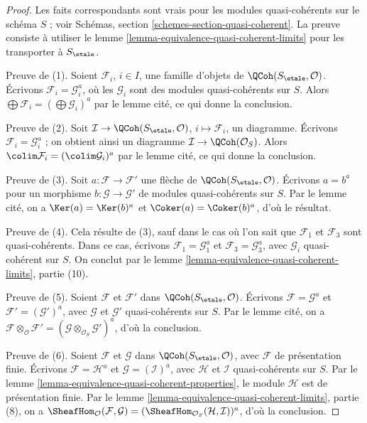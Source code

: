 \begin{proof}
Les faits correspondants sont vrais pour les modules quasi-cohérents sur le
schéma $S$ ; voir Schémas, section
\ref{schemes-section-quasi-coherent}. La preuve consiste à utiliser le
lemme \ref{lemma-equivalence-quasi-coherent-limits} pour les transporter à
$S_\etale$.

\medskip\noindent
Preuve de (1). Soient $\mathcal{F}_i$, $i \in I$, une famille d'objets de
$\QCoh(S_\etale, \mathcal{O})$. Écrivons
$\mathcal{F}_i = \mathcal{G}_i^a$, où les $\mathcal{G}_i$ sont des modules
quasi-cohérents sur $S$. Alors
$\bigoplus \mathcal{F}_i = (\bigoplus \mathcal{G}_i)^a$ par le lemme cité,
ce qui donne la conclusion.

\medskip\noindent
Preuve de (2). Soit
$\mathcal{I} \to \QCoh(S_\etale, \mathcal{O})$,
$i \mapsto \mathcal{F}_i$, un diagramme. Écrivons
$\mathcal{F}_i = \mathcal{G}_i^a$ ; on obtient ainsi un diagramme
$\mathcal{I} \to \QCoh(\mathcal{O}_S)$. Alors
$\colim \mathcal{F}_i = (\colim \mathcal{G}_i)^a$ par le lemme cité,
ce qui donne la conclusion.

\medskip\noindent
Preuve de (3). Soit $a : \mathcal{F} \to \mathcal{F}'$ une flèche de
$\QCoh(S_\etale, \mathcal{O})$. Écrivons $a = b^a$ pour un morphisme
$b : \mathcal{G} \to \mathcal{G}'$ de modules quasi-cohérents sur $S$.
Par le lemme cité, on a $\Ker(a) = \Ker(b)^a$ et
$\Coker(a) = \Coker(b)^a$, d'où le résultat.

\medskip\noindent
Preuve de (4). Cela résulte de (3), sauf dans le cas où l'on sait que
$\mathcal{F}_1$ et $\mathcal{F}_3$ sont quasi-cohérents. Dans ce cas,
écrivons $\mathcal{F}_1 = \mathcal{G}_1^a$ et
$\mathcal{F}_3 = \mathcal{G}_3^a$, avec $\mathcal{G}_i$ quasi-cohérent sur
$S$. On conclut par le lemme
\ref{lemma-equivalence-quasi-coherent-limits}, partie (10).

\medskip\noindent
Preuve de (5). Soient $\mathcal{F}$ et $\mathcal{F}'$ dans
$\QCoh(S_\etale, \mathcal{O})$. Écrivons
$\mathcal{F} = \mathcal{G}^a$ et
$\mathcal{F}' = (\mathcal{G}')^a$, avec $\mathcal{G}$ et $\mathcal{G}'$
quasi-cohérents sur $S$. Par le lemme cité, on a
$\mathcal{F} \otimes_\mathcal{O} \mathcal{F}' =
(\mathcal{G} \otimes_{\mathcal{O}_S} \mathcal{G}')^a$,
d'où la conclusion.

\medskip\noindent
Preuve de (6). Soient $\mathcal{F}$ et $\mathcal{G}$ dans
$\QCoh(S_\etale, \mathcal{O})$, avec $\mathcal{F}$ de présentation finie.
Écrivons $\mathcal{F} = \mathcal{H}^a$ et
$\mathcal{G} = (\mathcal{I})^a$, avec $\mathcal{H}$ et $\mathcal{I}$
quasi-cohérents sur $S$. Par le
lemme \ref{lemma-equivalence-quasi-coherent-properties}, le module
$\mathcal{H}$ est de présentation finie. Par le
lemme \ref{lemma-equivalence-quasi-coherent-limits}, partie (8), on a
$\SheafHom_\mathcal{O}(\mathcal{F}, \mathcal{G}) =
(\SheafHom_{\mathcal{O}_S}(\mathcal{H}, \mathcal{I}))^a$,
d'où la conclusion.
\end{proof}

